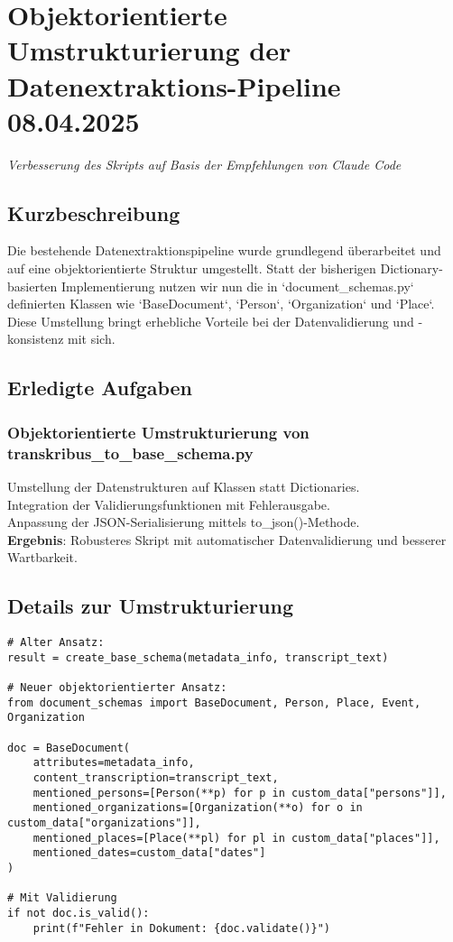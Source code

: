 \documentclass{article}
\begin{document}
\section{Objektorientierte Umstrukturierung der Datenextraktions-Pipeline \small 08.04.2025}
\small\textit{Verbesserung des Skripts auf Basis der Empfehlungen von Claude Code}\\
\subsection*{Kurzbeschreibung}

Die bestehende Datenextraktionspipeline wurde grundlegend überarbeitet und auf eine objektorientierte Struktur umgestellt. Statt der bisherigen Dictionary-basierten Implementierung nutzen wir nun die in `document\_schemas.py` definierten Klassen wie `BaseDocument`, `Person`, `Organization` und `Place`. Diese Umstellung bringt erhebliche Vorteile bei der Datenvalidierung und -konsistenz mit sich.

\subsection*{Erledigte Aufgaben}
\subsubsection*{\small Objektorientierte Umstrukturierung von transkribus\_to\_base\_schema.py}
 Umstellung der Datenstrukturen auf Klassen statt Dictionaries.\\
 Integration der Validierungsfunktionen mit Fehlerausgabe.\\
 Anpassung der JSON-Serialisierung mittels to\_json()-Methode.\\
\textbf{Ergebnis}: Robusteres Skript mit automatischer Datenvalidierung und besserer Wartbarkeit.

\subsection*{Details zur Umstrukturierung}

\begin{verbatim}
# Alter Ansatz:
result = create_base_schema(metadata_info, transcript_text)

# Neuer objektorientierter Ansatz:
from document_schemas import BaseDocument, Person, Place, Event, Organization

doc = BaseDocument(
    attributes=metadata_info,
    content_transcription=transcript_text,
    mentioned_persons=[Person(**p) for p in custom_data["persons"]],
    mentioned_organizations=[Organization(**o) for o in custom_data["organizations"]],
    mentioned_places=[Place(**pl) for pl in custom_data["places"]],
    mentioned_dates=custom_data["dates"]
)

# Mit Validierung
if not doc.is_valid():
    print(f"Fehler in Dokument: {doc.validate()}")
\end{verbatim}
\end{document}
